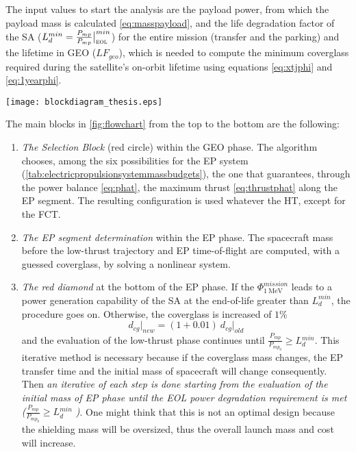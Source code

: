 The input values to start the analysis are the payload power, from which the payload mass is calculated \eqref{eq:masspayload}, and the life degradation factor of the SA ($L_d^{min}=\tfrac{P_{mp}}{P_{mp}}\big|^{min}_{\textsc{eol}}$) for the entire mission (transfer and the \textit{ } parking) and the lifetime in GEO ($LF_{geo}$), which is needed to compute the minimum coverglass required during the satellite’s on-orbit lifetime using equations \eqref{eq:xtjphi} and \eqref{eq:1yearphi}.
%
\begin{figure*}[htp]
\centering
\texttt{[image: blockdiagram\_thesis.eps]}
\caption{\textbf{Flowchart}}
\label{fig:flowchart}
\end{figure*}
%
The main blocks in \figurename\ref{fig:flowchart} from the top to the bottom are the following:
\begin{enumerate}
\item \emph{The Selection Block} (red circle) within the GEO phase. The algorithm chooses, among the six possibilities for the EP system (\tablename\ref{tab:electricpropulsionsystemmassbudgets}), the one that guarantees, through the power balance \eqref{eq:phat}, the maximum thrust \eqref{eq:thrustphat} along the EP segment. The resulting configuration is used whatever the HT, except for the FCT.
\item \emph{The EP segment determination} within the EP phase. The spacecraft mass before the low-thrust trajectory and EP time-of-flight are computed, with a guessed coverglass, by solving a nonlinear system.
\item \emph{The red diamond} at the bottom of the EP phase. If the $\Phi_{\scriptstyle{1~\si{\mega\electronvolt}}}^{\scriptstyle{mission}}$ leads to a power generation capability of the SA at the end-of-life greater than $L_d^{min}$, the procedure goes on. 
Otherwise, the coverglass is increased of $1\%$
\begin{equation}
d_{cg}\big|_{new} = (1+0.01)~d_{cg}\big|_{old}\label{eq.coverglassadd}
\end{equation}
and the evaluation of the low-thrust phase continues until $\tfrac{P_{\scriptstyle{mp}}}{P_{\scriptstyle{mp_{0}}}} \ge L{\scriptstyle{_d^{min}}}$.
This iterative method is necessary because if the coverglass mass changes, the EP transfer time and the initial mass of spacecraft will change consequently.
Then \emph{an iterative of each step is done starting from the evaluation of the initial mass of EP phase until the EOL power degradation requirement is met ($\tfrac{P_{\scriptstyle{mp}}}{P_{\scriptstyle{mp_{0}}}} \ge L{\scriptstyle{_d^{min}}}$ )}.
%
One might think that this is not an optimal design because the shielding mass will be oversized, thus the overall launch mass and cost will increase.


\end{enumerate}
